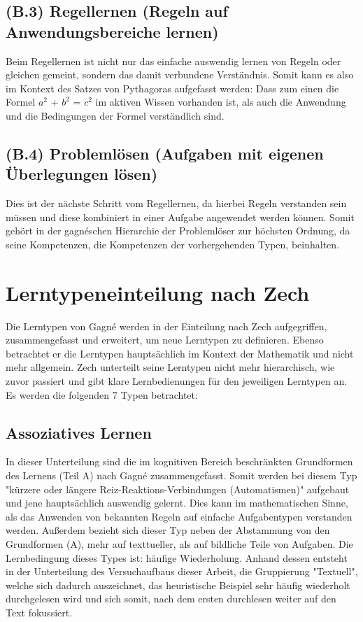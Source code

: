 \subsection[]{(B.3) Regellernen (Regeln auf Anwendungsbereiche lernen)}

Beim Regellernen ist nicht nur das einfache auswendig lernen von Regeln oder gleichen gemeint, sondern das damit verbundene Verständnis. Somit kann es also im Kontext des Satzes von Pythagoras aufgefasst werden: Dass zum einen die Formel $a^2$ + $b^2$ = $c^2$ im aktiven Wissen vorhanden ist, als auch die Anwendung und die Bedingungen der Formel verständlich sind\cite{zech1983grundkurs}.

\subsection[]{(B.4) Problemlösen (Aufgaben mit eigenen Überlegungen lösen)}

Dies ist der nächste Schritt vom Regellernen, da hierbei Regeln verstanden sein müssen und diese kombiniert in einer Aufgabe angewendet werden können. Somit gehört in der gagnéschen Hierarchie der Problemlöser zur höchsten Ordnung, da seine Kompetenzen, die Kompetenzen der vorhergehenden Typen, beinhalten\cite{zech1983grundkurs}.

\section{Lerntypeneinteilung nach Zech}

Die Lerntypen von Gagné werden in der Einteilung nach Zech aufgegriffen, zusammengefasst und erweitert, um neue Lerntypen zu definieren. Ebenso betrachtet er die Lerntypen hauptsächlich im Kontext der Mathematik und nicht mehr allgemein. Zech unterteilt seine Lerntypen nicht mehr hierarchisch, wie zuvor passiert und gibt klare Lernbedienungen für den jeweiligen Lerntypen an. Es werden die folgenden 7 Typen betrachtet:

\subsection[]{Assoziatives Lernen}

In dieser Unterteilung sind die im kognitiven Bereich beschränkten Grundformen des Lernens (Teil A) nach Gagné zusammengefasst. Somit werden bei diesem Typ "kürzere oder längere Reiz-Reaktions-Verbindungen (Automatismen)" aufgebaut und jene hauptsächlich auswendig gelernt. Dies kann im mathematischen Sinne, als das Anwenden von bekannten Regeln auf einfache Aufgabentypen verstanden werden. Außerdem bezieht sich dieser Typ neben der Abstammung von den Grundformen (A), mehr auf texttueller, als auf bildliche Teile von Aufgaben.
Die Lernbedingung dieses Types ist: häufige Wiederholung. 
Anhand dessen entsteht in der Unterteilung des Versuchaufbaus dieser Arbeit, die Gruppierung "Textuell", welche sich dadurch auszeichnet, das heuristische Beispiel sehr häufig wiederholt durchgelesen wird und sich somit, nach dem ersten durchlesen weiter auf den Text fokussiert\cite{zech1983grundkurs}. 


